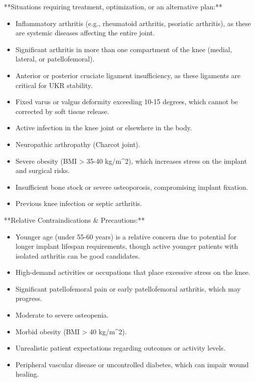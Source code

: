**Situations requiring treatment, optimization, or an alternative plan:**

\begin{itemize}
  \item Inflammatory arthritis (e.g., rheumatoid arthritis, psoriatic arthritis), as these are systemic diseases affecting the entire joint.
  \item Significant arthritis in more than one compartment of the knee (medial, lateral, or patellofemoral).
  \item Anterior or posterior cruciate ligament insufficiency, as these ligaments are critical for UKR stability.
  \item Fixed varus or valgus deformity exceeding 10-15 degrees, which cannot be corrected by soft tissue release.
  \item Active infection in the knee joint or elsewhere in the body.
  \item Neuropathic arthropathy (Charcot joint).
  \item Severe obesity (BMI > 35-40 kg/m\textasciicircum{}2), which increases stress on the implant and surgical risks.
  \item Insufficient bone stock or severe osteoporosis, compromising implant fixation.
  \item Previous knee infection or septic arthritis.
\end{itemize}

**Relative Contraindications \& Precautions:**

\begin{itemize}
  \item Younger age (under 55-60 years) is a relative concern due to potential for longer implant lifespan requirements, though active younger patients with isolated arthritis can be good candidates.
  \item High-demand activities or occupations that place excessive stress on the knee.
  \item Significant patellofemoral pain or early patellofemoral arthritis, which may progress.
  \item Moderate to severe osteopenia.
  \item Morbid obesity (BMI > 40 kg/m\textasciicircum{}2).
  \item Unrealistic patient expectations regarding outcomes or activity levels.
  \item Peripheral vascular disease or uncontrolled diabetes, which can impair wound healing.
\end{itemize}

